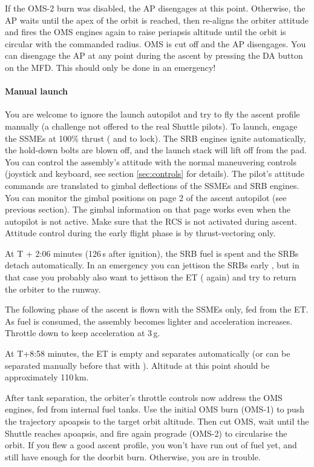 \documentclass[Orbiter User Manual.tex]{subfiles}
\begin{document}
If the OMS-2 burn was disabled, the AP disengages at this point. Otherwise, the
AP waits until the apex of the orbit is reached, then re-aligns the orbiter
attitude and fires the OMS engines again to raise periapsis altitude until the
orbit is circular with the commanded radius. OMS is cut off and the AP
disengages.
You can disengage the AP at any point during the ascent by pressing the DA
button on the MFD. This should only be done in an emergency!


\paragraph{Manual launch}
You are welcome to ignore the launch autopilot and try to fly the ascent profile
manually (a challenge not offered to the real Shuttle pilots). To launch, engage
the SSMEs at 100\% thrust (\keystroke{+}\num{} and  to lock).
The SRB engines ignite automatically, the hold-down bolts are blown off, and the
launch stack will lift off from the pad. You can control the assembly's attitude
with the normal maneuvering controls (joystick and keyboard, see section
\ref{sec:controls} for details). The pilot's attitude commands are translated to
gimbal deflections of the SSMEs and SRB engines. You can monitor the gimbal
positions on page 2 of the ascent autopilot (see previous section). The gimbal
information on that page works even when the autopilot is not active. Make sure
that the RCS is not activated during ascent. Attitude control during the early
flight phase is by thrust-vectoring only.

At T + 2:06 minutes (126\,s after ignition), the SRB fuel is spent and the SRBs
detach automatically. In an emergency you can jettison the SRBs early
, but in that case you probably also want to jettison the ET
( again) and try to return the orbiter to the runway.

The following phase of the ascent is flown with the SSMEs only, fed from the ET.
As fuel is consumed, the assembly becomes lighter and acceleration increases.
Throttle down to keep acceleration at 3\,g.

At T+8:58 minutes, the ET is empty and separates automatically (or can be
separated manually before that with ). Altitude at this point
should be approximately 110\,km.

After tank separation, the orbiter's throttle controls now address the OMS
engines, fed from internal fuel tanks. Use the initial OMS burn (OMS-1) to push
the trajectory apoapsis to the target orbit altitude. Then cut OMS, wait until
the Shuttle reaches apoapsis, and fire again prograde (OMS-2) to circularise the
orbit. If you flew a good ascent profile, you won't have run out of fuel yet,
and still have enough for the deorbit burn. Otherwise, you are in trouble.
\end{document}
